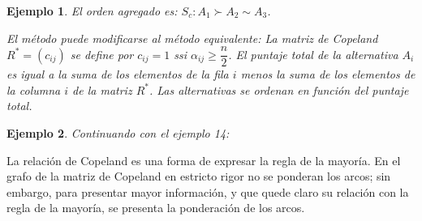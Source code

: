 \documentclass[a5paper,doc,10pt,noapacite]{apa6}
\newtheorem{ejem}{Ejemplo}
\begin{document}
{{\begin{ejem}
El orden agregado es: \(S_c: A_1 \succ A_2 \sim A_3\).

El método puede modificarse al método equivalente: La matriz de Copeland \(R^* = (c_{ij})\) se define por \(c_{ij} = 1\) ssi \(\alpha_{ij} \geq \dfrac{n}{2}\). El puntaje total de la alternativa \(A_i\) es igual a la suma de los elementos de la fila \(i\) menos la suma de los elementos de la columna \(i\) de la matriz \(R^*\). Las alternativas se ordenan en función del puntaje total.

\end{ejem}

\newpage
\begin{ejem} Continuando con el ejemplo 14:

\vspace{-1\baselineskip}
\begin{figure}[H]
\begin{floatrow}
	\fontsize{7}{11}\selectfont
	\captionsetup{justification=centering, labelfont=footnotesize, font=footnotesize}
\end{floatrow}
\end{figure}
\end{ejem}


La relación de Copeland es una forma de expresar la regla de la mayoría. En el grafo de la matriz de Copeland en estricto rigor no se ponderan los arcos; sin embargo, para presentar mayor información, y que quede claro su relación con la regla de la mayoría, se presenta la ponderación de los arcos.

}}
\end{document}

